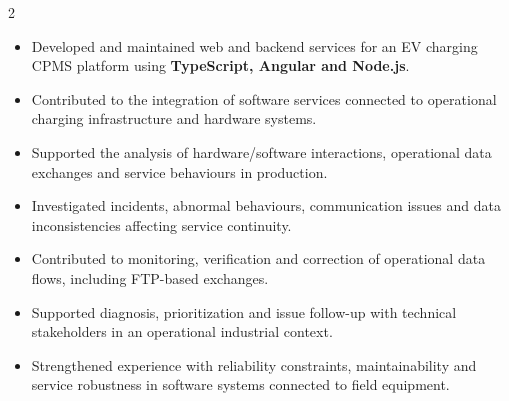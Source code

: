 \documentclass[8pt,a4paper,ragged2e,withhyper]{altacv}
\begin{document}



\makecvheader

\vspace{-0.3cm}


\begin{paracol}{2}



\begin{itemize}
\item Developed and maintained web and backend services for an EV charging CPMS platform using \textbf{TypeScript, Angular and Node.js}.
\item Contributed to the integration of software services connected to operational charging infrastructure and hardware systems.
\item Supported the analysis of hardware/software interactions, operational data exchanges and service behaviours in production.
\item Investigated incidents, abnormal behaviours, communication issues and data inconsistencies affecting service continuity.
\item Contributed to monitoring, verification and correction of operational data flows, including FTP-based exchanges.
\item Supported diagnosis, prioritization and issue follow-up with technical stakeholders in an operational industrial context.
\item Strengthened experience with reliability constraints, maintainability and service robustness in software systems connected to field equipment.
\end{itemize}

\divider



\end{paracol}
\end{document}
